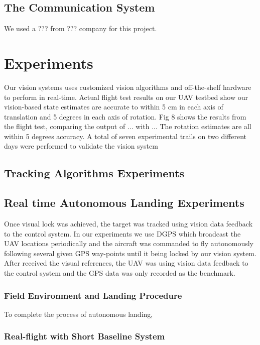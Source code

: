 \subsection{The Communication System}
We used a ??? from ??? company for this project.


\section{Experiments}

Our vision systems uses customized vision algorithms and off-the-shelf hardware to perform in real-time.
Actual flight test results on our UAV testbed show our vision-based state estimates are accurate to within 5 cm in each axis of translation and 5 degrees in each axis of rotation.
Fig 8 shows the results from the flight test, comparing the output of ... with ...
The rotation estimates are all within 5 degrees accuracy.
A total of seven experimental trails on two different days were performed to validate the vision system

\subsection{Tracking Algorithms Experiments}


\subsection{Real time Autonomous Landing Experiments}

Once visual lock was achieved, the target was tracked using vision data feedback to the control system.
%
In our experiments we use DGPS which broadcast the UAV locations periodically and the aircraft was commanded to fly autonomously following several given GPS way-points until it being locked by our vision system. After received the visual references, the UAV was using vision data feedback to the control system and the GPS data was only recorded as the benchmark.



\subsubsection{Field Environment and Landing Procedure}
To complete the process of autonomous landing,



\subsubsection{Real-flight with Short Baseline System}

